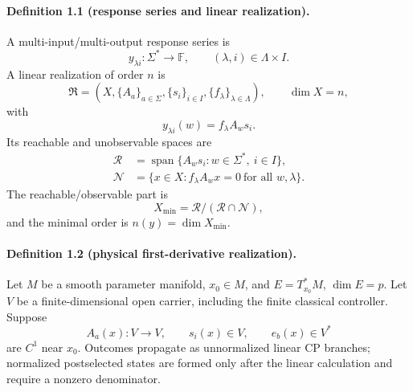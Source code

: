 \documentclass[aps,prl,reprint,superscriptaddress,nofootinbib]{revtex4-2}
\newcommand{\F}{\mathbb F}
\newcommand{\cN}{\mathcal N}
\newcommand{\cR}{\mathcal R}
\begin{document}
\paragraph{Definition 1.1 (response series and linear realization).}
A multi-input/multi-output response series is
\begin{equation}
 y_{\lambda i}:\Sigma^*\longrightarrow\F,
 \qquad (\lambda,i)\in\Lambda\times I.
 \label{eq:response-series}
\end{equation}
A linear realization of order $n$ is
\begin{equation}
 \mathfrak R=(X,\{A_a\}_{a\in\Sigma},\{s_i\}_{i\in I},
 \{f_\lambda\}_{\lambda\in\Lambda}),
 \qquad \dim X=n,
 \label{eq:linear-realization}
\end{equation}
with
\begin{equation}
 y_{\lambda i}(w)=f_\lambda A_ws_i.
 \label{eq:realization-output}
\end{equation}
Its reachable and unobservable spaces are
\begin{align}
 \cR&=\operatorname{span}\{A_ws_i:w\in\Sigma^*,\ i\in I\},\label{eq:reachable}\\
 \cN&=\{x\in X:f_\lambda A_wx=0\ \text{for all }w,\lambda\}.
 \label{eq:unobservable}
\end{align}
The reachable/observable part is
\begin{equation}
 X_{\min}=\cR/(\cR\cap\cN),
 \label{eq:minimal-quotient}
\end{equation}
and the minimal order is $n(y)=\dim X_{\min}$.

\paragraph{Definition 1.2 (physical first-derivative realization).}
Let $M$ be a smooth parameter manifold, $x_0\in M$, and $E=T^*_{x_0}M$, $\dim E=p$.  Let $V$ be a finite-dimensional open carrier, including the finite classical controller.  Suppose
\begin{equation}
 A_a(x):V\to V,
 \qquad s_i(x)\in V,
 \qquad e_b(x)\in V^*
 \label{eq:physical-data}
\end{equation}
are $C^1$ near $x_0$.  Outcomes propagate as unnormalized linear CP branches; normalized postselected states are formed only after the linear calculation and require a nonzero denominator.
\end{document}
